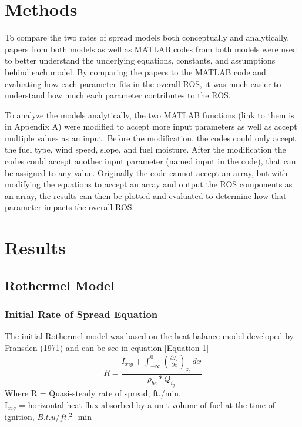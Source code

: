 \documentclass{article}
\begin{document}
\section{Methods}
To compare the two rates of spread models both conceptually and analytically, papers from both models as well as MATLAB codes from both models were used to better understand the underlying equations, constants, and assumptions behind each model. By comparing the papers to the MATLAB code and evaluating how each parameter fits in the overall ROS, it was much easier to understand how much each parameter contributes to the ROS. 


To analyze the models analytically, the two MATLAB functions (link to them is in Appendix A) were modified to accept more input parameters as well as accept multiple values as an input. Before the modification, the codes could only accept the fuel type, wind speed, slope, and fuel moisture. After the modification the codes could accept another input parameter (named input in the code), that can be assigned to any value. Originally the code cannot accept an array, but with modifying the equations to accept an array and output the ROS components as an array, the results can then be plotted and evaluated to determine how that parameter impacts the overall ROS. 

\section{Results}
\subsection{Rothermel Model}
\subsubsection{Initial Rate of Spread Equation}

The initial Rothermel model was based on the heat balance model developed by Fransden (1971) and can be see in equation \ref{Equation 1}
\begin{equation}
R = \frac {I_{xig} + \int_{-\infty}^{0} (\frac {\partial I_{z}} {\partial z})_{z_c}\,dx }{\rho_{be} * Q_{i_g}}
\label{Equation 1}
\end{equation}
Where R = Quasi-steady rate of spread, ft./min. \\

\noindent I$_{xig}$ = horizontal heat flux absorbed by a unit volume of fuel at the time of ignition, $B.t.u/ft.^2$ -min \\
\end{document}
